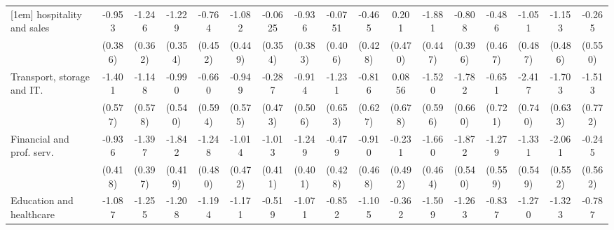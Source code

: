 {\begin{tabular}{l*{16}{c}}
[1em]
hospitality and sales&      -0.953\sym{*}  &      -1.246\sym{***}&      -1.229\sym{***}&      -0.764         &      -1.082\sym{*}  &     -0.0625         &      -0.936\sym{*}  &     -0.0751         &      -0.465         &       0.201         &      -1.881\sym{***}&      -0.808\sym{*}  &      -0.486         &      -1.051\sym{*}  &      -1.153\sym{*}  &      -0.265         \\
                    &     (0.386)         &     (0.362)         &     (0.354)         &     (0.452)         &     (0.449)         &     (0.354)         &     (0.383)         &     (0.406)         &     (0.428)         &     (0.470)         &     (0.447)         &     (0.396)         &     (0.467)         &     (0.487)         &     (0.486)         &     (0.550)         \\
[1em]
Transport, storage and IT.&      -1.401\sym{*}  &      -1.148\sym{*}  &      -0.990         &      -0.660         &      -0.949         &      -0.287         &      -0.914         &      -1.231         &      -0.816         &      0.0856         &      -1.520\sym{*}  &      -1.782\sym{**} &      -0.651         &      -2.417\sym{**} &      -1.703\sym{**} &      -1.513         \\
                    &     (0.577)         &     (0.578)         &     (0.540)         &     (0.594)         &     (0.575)         &     (0.473)         &     (0.506)         &     (0.653)         &     (0.627)         &     (0.678)         &     (0.596)         &     (0.660)         &     (0.721)         &     (0.740)         &     (0.633)         &     (0.772)         \\
[1em]
Financial and prof. serv.&      -0.936\sym{*}  &      -1.397\sym{***}&      -1.842\sym{***}&      -1.248\sym{**} &      -1.014\sym{*}  &      -1.013\sym{*}  &      -1.249\sym{**} &      -0.479         &      -0.910         &      -0.231         &      -1.660\sym{***}&      -1.872\sym{***}&      -1.279\sym{*}  &      -1.331\sym{*}  &      -2.061\sym{***}&      -0.245         \\
                    &     (0.418)         &     (0.397)         &     (0.419)         &     (0.480)         &     (0.472)         &     (0.411)         &     (0.401)         &     (0.428)         &     (0.468)         &     (0.492)         &     (0.464)         &     (0.540)         &     (0.559)         &     (0.549)         &     (0.552)         &     (0.562)         \\
[1em]
Education and healthcare&      -1.087\sym{**} &      -1.255\sym{**} &      -1.208\sym{**} &      -1.194\sym{**} &      -1.171\sym{*}  &      -0.519         &      -1.071\sym{**} &      -0.852         &      -1.105\sym{*}  &      -0.362         &      -1.509\sym{***}&      -1.263\sym{**} &      -0.837         &      -1.270\sym{*}  &      -1.323\sym{**} &      -0.787         \\

\end{tabular}}
